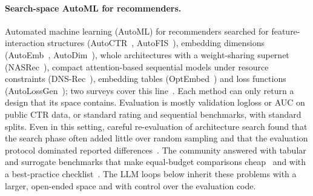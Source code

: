 \documentclass[sigconf,nonacm]{acmart}
\begin{document}
\paragraph{Search-space AutoML for recommenders.} Automated machine learning (AutoML) for recommenders searched for feature-interaction structures
(AutoCTR~\cite{song2020autoctr}, AutoFIS~\cite{liu2020autofis}), embedding dimensions (AutoEmb~\cite{zhao2020autoemb},
AutoDim~\cite{zhao2020autodim}), whole architectures with a weight-sharing supernet (NASRec~\cite{zhang2023nasrec}),
compact attention-based sequential models under resource constraints (DNS-Rec~\cite{zhang2024dnsrec}), embedding
tables (OptEmbed~\cite{lyu2022optembed}) and loss functions (AutoLossGen~\cite{li2022autolossgen}); two surveys
cover this line~\cite{zheng2022automl,chen2022automlrecsurvey}. Each method can only return a design that its space contains. Evaluation is mostly
validation logloss or AUC on public CTR data, or standard rating and sequential benchmarks, with standard splits. Even
in this setting, careful re-evaluation of architecture search found that the search phase often added little over
random sampling and that the evaluation protocol dominated reported differences~\cite{li2019randomnas,yu2020searchphase,
yang2020nashard}. The community answered with tabular and surrogate benchmarks that make equal-budget comparisons
cheap~\cite{ying2019nasbench101,dong2020nasbench201,eggensperger2021hpobench} and with a best-practice
checklist~\cite{lindauer2020bestpractices}. The LLM loops below inherit these problems with a larger, open-ended space
and with control over the evaluation code.
\end{document}
